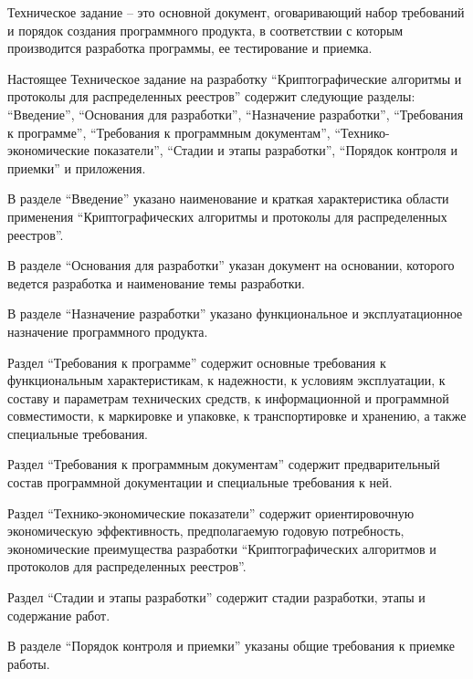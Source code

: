 \tab[0.75cm] Техническое задание – это основной документ, оговаривающий набор требований и
порядок создания программного продукта, в соответствии с которым производится разработка
программы, ее тестирование и приемка.

Настоящее Техническое задание на разработку ``Криптографические алгоритмы и протоколы для распределенных реестров'' содержит
следующие разделы: ``Введение'', ``Основания для разработки'', ``Назначение
разработки'', ``Требования к программе'', ``Требования к программным
документам'', ``Технико-экономические показатели'', ``Стадии и этапы
разработки'', ``Порядок контроля и приемки'' и приложения.

В разделе ``Введение'' указано наименование и краткая характеристика области применения
``Криптографических алгоритмы и протоколы для распределенных реестров''.

В разделе ``Основания для разработки'' указан документ на основании, которого ведется
разработка и наименование темы разработки.

В разделе ``Назначение разработки'' указано функциональное и эксплуатационное
назначение программного продукта.

Раздел ``Требования к программе'' содержит основные требования к функциональным
характеристикам, к надежности, к условиям эксплуатации, к составу и параметрам технических
средств, к информационной и программной совместимости, к маркировке и упаковке, к
транспортировке и хранению, а также специальные требования.

Раздел ``Требования к программным документам'' содержит предварительный состав
программной документации и специальные требования к ней.

Раздел ``Технико-экономические показатели'' содержит ориентировочную экономическую
эффективность, предполагаемую годовую потребность, экономические преимущества разработки
``Криптографических алгоритмов и протоколов для распределенных реестров''.

Раздел ``Стадии и этапы разработки'' содержит стадии разработки, этапы и содержание
работ.

В разделе ``Порядок контроля и приемки'' указаны общие требования к приемке работы.


